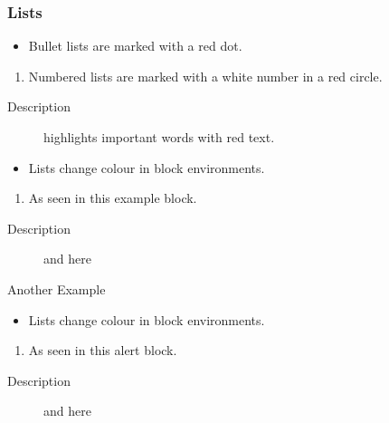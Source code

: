 \documentclass{beamer}
\begin{document}
\begin{frame}
  \frametitle{Lists}

  \begin{itemize}
    \item Bullet lists are marked with a red dot.
  \end{itemize}

  \begin{enumerate}
    \item Numbered lists are marked with a white number in a red circle.
  \end{enumerate}

  \begin{description}
    \item[Description] highlights important words with red text.
  \end{description}

  \begin{example}

    \begin{itemize}
      \item Lists change colour in block environments.
    \end{itemize}

    \begin{enumerate}
      \item As seen in this example block.
    \end{enumerate}

    \begin{description}
      \item[Description] and here
    \end{description}

  \end{example}

  \begin{alertblock}{Another Example}

    \begin{itemize}
      \item Lists change colour in block environments.
    \end{itemize}

    \begin{enumerate}
      \item As seen in this alert block.
    \end{enumerate}

    \begin{description}
      \item[Description] and here
    \end{description}

  \end{alertblock}

\end{frame}
\end{document}
